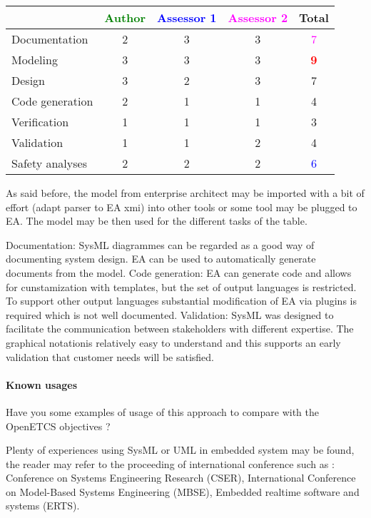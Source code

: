 \begin{tabular}{|l | c | c | c | c|}
\hline
& \textcolor{green}{Author} & \textcolor{blue}{Assessor 1} & \textcolor{magenta}{Assessor 2} & Total \\
\hline 
Documentation & 2    & 3    & 3    & \textcolor{magenta}{7} \\
\hline
Modeling & 3    & 3    & 3    & \textcolor{red}{\textbf{9}} \\
\hline
Design & 3    & 2    & 3    &  7 \\
\hline
Code generation &2 & 1    & 1    & 4    \\
\hline
Verification & 1    & 1    & 1    & 3    \\
\hline
Validation & 1    & 1    & 2    & 4    \\
\hline
Safety analyses & 2    & 2    & 2    & \textcolor{blue}{6} \\
\hline
\end{tabular}
\begin{author_comment}
As said before, the model from enterprise architect may be imported
with a bit of effort (adapt parser to EA xmi) into other tools or some
tool may be plugged to EA. The model may be then used for the
different tasks of the table.
\end{author_comment}
\begin{assessor2}
Documentation: SysML diagrammes can be regarded as a good way of documenting system design. EA can be used to automatically generate documents from the model.
Code generation: EA can generate code and allows for cunstamization with templates, but the set of output languages is restricted. To support other output languages substantial modification of EA via plugins is required which is not well documented.
Validation: SysML was designed to facilitate the communication between stakeholders with different expertise. The graphical notationis relatively easy to understand and this supports an early validation that customer needs will be satisfied.
\end{assessor2}


\paragraph{Known usages} Have you some examples of usage of this
approach to  compare with the OpenETCS objectives ?

Plenty of experiences using SysML or UML in embedded system may be
found, the reader may refer to the proceeding of international
conference such as : Conference on Systems Engineering
Research (CSER), International Conference on Model-Based Systems Engineering
(MBSE), Embedded realtime software and systems (ERTS).
 

